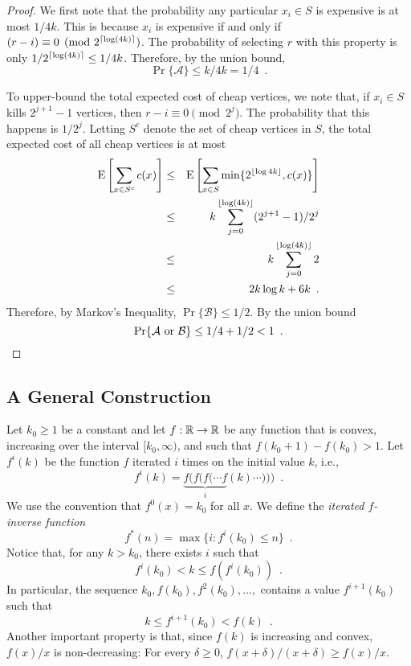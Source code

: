 \documentclass{patmorin}
\begin{document}
\begin{proof}
  We first note that the probability any particular $x_i\in S$ is
  expensive is at most $1/4k$.  This is because $x_i$ is expensive if and
  only if $(r-i)\equiv 0 \pmod {2^{{\lceil \log(4k) \rceil}}}$.  The probability
  of selecting $r$ with this property is only $1/2^{{\lceil \log(4k) \rceil}}
  \le 1/4k$. Therefore, by the union bound,
  \[
     \Pr\{\mathcal{A}\} \le k/4k = 1/4 \enspace .
  \]

  To upper-bound the total expected cost of cheap vertices, we note that,
  if $x_i\in S$ kills $2^{j+1}-1$ vertices, then $r-i\equiv 0\pmod{2^j}$.
  The probability that this happens is $1/2^{j}$. 
  Letting $S^{c}$
  denote the set of cheap vertices in $S$, the total expected cost of
  all cheap vertices is at most
  \begin{eqnarray*}
     \mathrm{E}\left[\sum_{x\in S^{c}}c(x) \right] 
     &\le& \mathrm{E}\left[\sum_{x\in S}\min\{2^{{\lfloor \log 4k \rfloor}},c(x)\} \right]  \\
    &\le&  k\sum_{j=0}^{{\lfloor \log (4k) \rfloor}} (2^{j+1}-1)/2^j \\
     &\le& k\sum_{j=0}^{{\lfloor \log (4k) \rfloor}} 2 \\
     &\le & 2k\log k + 6k \enspace .
  \end{eqnarray*}
  Therefore, by Markov's Inequality, $\Pr\{\mathcal{B}\}\le 1/2$.
  By the union bound
  \[
     \Pr\{\mbox{$\mathcal{A}$ or $\mathcal{B}$}\} \le 1/4+ 1/2 < 1
  \enspace . \qedhere
  \]
\end{proof}

\subsection{A General Construction}

Let $k_0\ge 1$ be a constant and let $f:\mathbb{R}\rightarrow\mathbb{R}$ be any function
that is convex, increasing over the interval $[k_0,\infty)$, and such that
$f(k_0+1)-f(k_0) > 1$.  Let $f^{i}(k)$ be the function $f$ iterated $i$
times on the initial value $k$, i.e.,
\[
   f^{i}(k) = \underbrace{f(f(f(\cdots f}_{i}(k)\cdots))) \enspace .
\]
We use the convention that $f^0(x) = k_0$ for all $x$.  We define the
\emph{iterated $f$-inverse function}
\[
   f^*(n) = \max\{i : f^{i}(k_0) \le n\} \enspace .
\] 
Notice that, for any $k> k_0$, there exists $i$ such that
\[
   f^i(k_0) < k \le f(f^i(k_0)) \enspace .
\]
In particular, the sequence $k_0,f(k_0),f^2(k_0),\ldots,$ contains
a value $f^{i+1}(k_0)$ such that
\[
      k  \le  f^{i+1}(k_0) < f(k) \enspace .
\]
Another important property is that, since $f(k)$ is increasing
and convex, $f(x)/x$ is non-decreasing: For every $\delta\ge 0$,
$f(x+\delta)/(x+\delta) \ge f(x)/x$.
\end{document}
